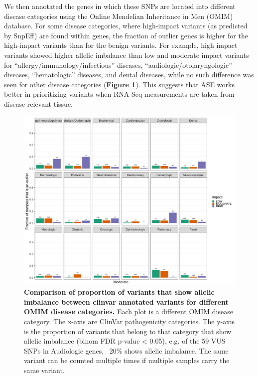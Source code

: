 We then annotated the genes in which these SNPs are located into different disease categories using the Online Mendelian Inheritance in Men (OMIM) database\cite{hamoshOnlineMendelianInheritance2000}. For some disease categories, where high-impact variants (as predicted by SnpEff\cite{cingolaniProgramAnnotatingPredicting2012}) are found within genes, the fraction of outlier genes is higher for the high-impact variants than for the benign variants. For example, high impact variants showed higher allelic imbalance than low and moderate impact variants for “allergy/immunology/infectious” diseases, “audiologic/otolaryngologic” diseases, “hematologic” diseases, and dental diseases, while no such difference was seen for other disease categories (\textbf{Figure \ref{ase_fig3}}). This suggests that ASE works better in prioritizing variants when RNA-Seq measurements are taken from disease-relevant tissue. 

\begin{figure}[h!]
	\includegraphics[width=\textwidth]{chapters/chapter3-allele-specific-expression/img/fig3.pdf}
	\caption{\textbf{Comparison of proportion of variants that show allelic imbalance between clinvar annotated variants for different OMIM disease categories.} Each plot is a different OMIM disease category. The x-axis are ClinVar pathogenicity categories. The y-axis is the proportion of variants that belong to that category that show allelic imbalance (binom FDR p-value < 0.05), e.g. of the 59 VUS SNPs in Audiologic genes, ~20\% shows allelic imbalance. The same variant can be counted multiple times if multiple samples carry the same variant. }
	\label{ase_fig3}
\end{figure}


